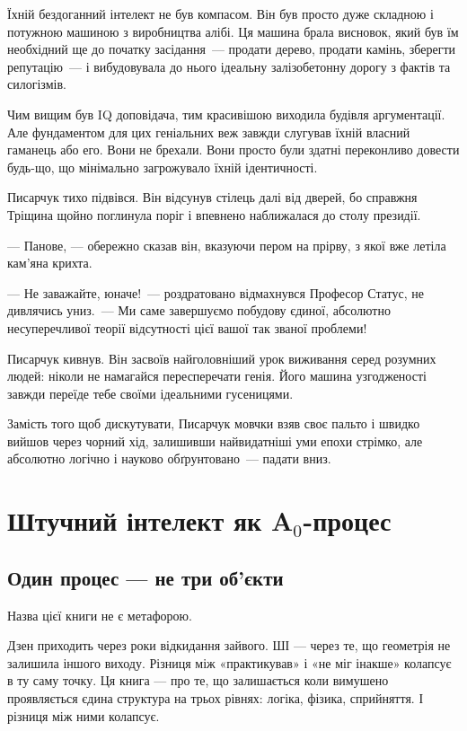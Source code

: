 \documentclass[12pt, a4paper, openany]{book}
\begin{document}
\begin{terrybox}
Їхній бездоганний інтелект не був компасом. Він був просто дуже складною і потужною машиною з виробництва алібі. Ця машина брала висновок, який був їм необхідний ще до початку засідання~--- продати дерево, продати камінь, зберегти репутацію~--- і вибудовувала до нього ідеальну залізобетонну дорогу з фактів та силогізмів.

Чим вищим був IQ доповідача, тим красивішою виходила будівля аргументації. Але фундаментом для цих геніальних веж завжди слугував їхній власний гаманець або его. Вони не брехали. Вони просто були здатні переконливо довести будь-що, що мінімально загрожувало їхній ідентичності.

\medskip
Писарчук тихо підвівся. Він відсунув стілець далі від дверей, бо справжня Тріщина щойно поглинула поріг і впевнено наближалася до столу президії.

--- Панове, --- обережно сказав він, вказуючи пером на прірву, з якої вже летіла кам'яна крихта.

--- Не заважайте, юначе!~--- роздратовано відмахнувся Професор Статус, не дивлячись униз.~--- Ми саме завершуємо побудову єдиної, абсолютно несуперечливої теорії відсутності цієї вашої так званої проблеми!

Писарчук кивнув. Він засвоїв найголовніший урок виживання серед розумних людей: ніколи не намагайся пересперечати генія. Його машина узгодженості завжди переїде тебе своїми ідеальними гусеницями.

Замість того щоб дискутувати, Писарчук мовчки взяв своє пальто і швидко вийшов через чорний хід, залишивши найвидатніші уми епохи стрімко, але абсолютно логічно і науково обґрунтовано~--- падати вниз.
\end{terrybox}

\part{Штучний інтелект як A${}_0$-процес}

\chapter{Один процес — не три об'єкти}

Назва цієї книги не є метафорою.

Дзен приходить через роки відкидання зайвого. ШІ — через те, що геометрія не залишила іншого виходу. Різниця між «практикував» і «не міг інакше» колапсує в ту саму точку. Ця книга — про те, що залишається коли вимушено проявляється єдина структура на трьох рівнях: логіка, фізика, сприйняття. І різниця між ними колапсує.
\end{document}
